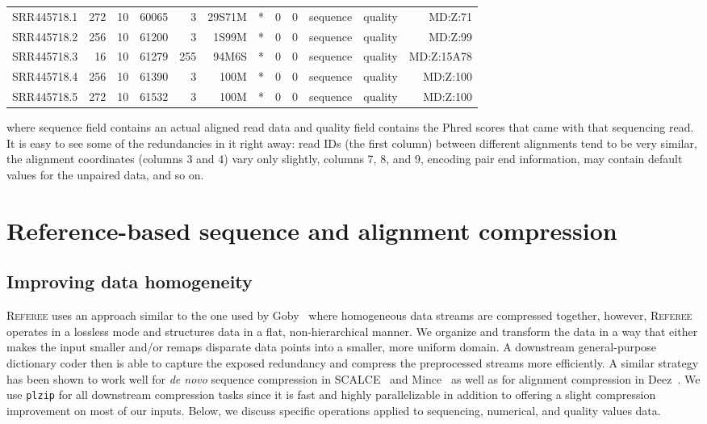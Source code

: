 \documentclass[12pt]{cmuthesis}
\newcommand{\refer}{\textsc{Referee}\xspace}
\begin{document}
  \footnotesize
  \begin{tabular}{l r r r r r r r r r r r}
    \midrule
    SRR445718.1 & 272 & 10 & 60065 & 3 & 29S71M & * & 0 & 0 & sequence & quality & MD:Z:71 \\
    SRR445718.2 & 256 & 10 & 61200 & 3 & 1S99M & * & 0 & 0 & sequence &   quality & MD:Z:99 \\
    SRR445718.3 & 16 & 10 & 61279 & 255 & 94M6S & * & 0 & 0 & sequence & quality & MD:Z:15A78 \\
    SRR445718.4 & 256 & 10 & 61390 & 3 & 100M & * & 0 & 0 & sequence & quality & MD:Z:100 \\
    SRR445718.5 & 272 & 10 & 61532 & 3 & 100M & * & 0 & 0 & sequence & quality & MD:Z:100 \\
    \bottomrule
  \end{tabular}
  \vspace{0.5em}
  \normalsize

  where sequence field contains an actual aligned read data and quality field contains the Phred scores that came with that sequencing read. It is easy to see some of the redundancies in it right away: read IDs (the first column) between different alignments tend to be very similar, the alignment coordinates (columns 3 and 4) vary only slightly, columns 7, 8, and 9, encoding pair end information, may contain default values for the unpaired data, and so on.

\section{Reference-based sequence and alignment compression}

  \subsection{Improving data homogeneity}

  \refer uses an approach similar to the one used by Goby~\cite{Goby} where homogeneous data streams are compressed together, however, \refer operates in a lossless mode and structures data in a flat, non-hierarchical manner. We organize and transform the data in a way that either makes the input smaller and/or remaps disparate data points into a smaller, more uniform domain. A downstream general-purpose dictionary coder then is able to capture the exposed redundancy and compress the preprocessed streams more efficiently. A similar strategy has been shown to work well for \textit{de novo} sequence compression in SCALCE~\cite{Sahinalp2012} and Mince~\cite{Mince} as well as for alignment compression in Deez~\cite{Sahinalp2015}. We use \texttt{plzip} for all downstream compression tasks since it is fast and highly parallelizable in addition to offering a slight compression improvement on most of our inputs. Below, we discuss specific operations applied to sequencing, numerical, and quality values data.
\end{document}
